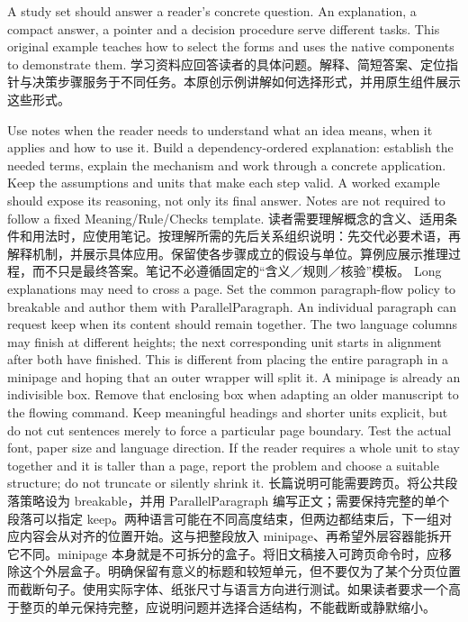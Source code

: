  {A study set should answer a reader's concrete question. An explanation, a compact answer, a pointer and a decision procedure serve different tasks. This original example teaches how to select the forms and uses the native components to demonstrate them.}
 {学习资料应回答读者的具体问题。解释、简短答案、定位指针与决策步骤服务于不同任务。本原创示例讲解如何选择形式，并用原生组件展示这些形式。}

 {Use notes when the reader needs to understand what an idea means, when it applies and how to use it. Build a dependency-ordered explanation: establish the needed terms, explain the mechanism and work through a concrete application. Keep the assumptions and units that make each step valid. A worked example should expose its reasoning, not only its final answer. Notes are not required to follow a fixed Meaning/Rule/Checks template.}
 {读者需要理解概念的含义、适用条件和用法时，应使用笔记。按理解所需的先后关系组织说明：先交代必要术语，再解释机制，并展示具体应用。保留使各步骤成立的假设与单位。算例应展示推理过程，而不只是最终答案。笔记不必遵循固定的“含义／规则／核验”模板。}
 {Long explanations may need to cross a page. Set the common paragraph-flow policy to breakable and author them with ParallelParagraph. An individual paragraph can request keep when its content should remain together. The two language columns may finish at different heights; the next corresponding unit starts in alignment after both have finished. This is different from placing the entire paragraph in a minipage and hoping that an outer wrapper will split it. A minipage is already an indivisible box. Remove that enclosing box when adapting an older manuscript to the flowing command. Keep meaningful headings and shorter units explicit, but do not cut sentences merely to force a particular page boundary. Test the actual font, paper size and language direction. If the reader requires a whole unit to stay together and it is taller than a page, report the problem and choose a suitable structure; do not truncate or silently shrink it.}
 {长篇说明可能需要跨页。将公共段落策略设为 breakable，并用 ParallelParagraph 编写正文；需要保持完整的单个段落可以指定 keep。两种语言可能在不同高度结束，但两边都结束后，下一组对应内容会从对齐的位置开始。这与把整段放入 minipage、再希望外层容器能拆开它不同。minipage 本身就是不可拆分的盒子。将旧文稿接入可跨页命令时，应移除这个外层盒子。明确保留有意义的标题和较短单元，但不要仅为了某个分页位置而截断句子。使用实际字体、纸张尺寸与语言方向进行测试。如果读者要求一个高于整页的单元保持完整，应说明问题并选择合适结构，不能截断或静默缩小。}
